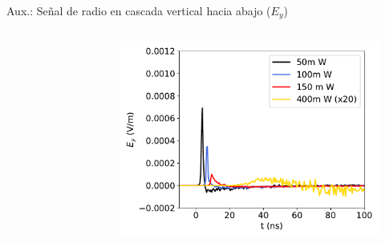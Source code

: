 \documentclass{beamer}
\begin{document}
\begin{frame}[noframenumbering]{Aux.: Señal de radio en cascada vertical hacia abajo ($E_y$)}
\begin{columns}
\begin{figure}[H]
	\end{figure}
	\begin{figure}[H]
		\centering
		\includegraphics[width=.8\linewidth]{figures/radio/p_1e17_0deg_EW_W_v2}
	\end{figure}
	\end{columns}
\end{frame}
\end{document}
